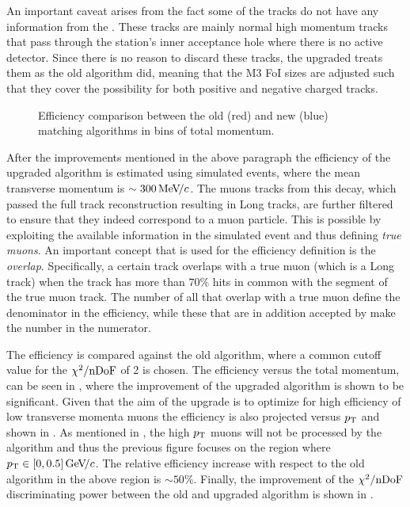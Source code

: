 An important caveat arises from the fact some of the \veloTTracks tracks do not have any information from
the \ttracker. These tracks are mainly normal high momentum tracks that pass through the \ttracker station's inner
acceptance hole where there is no active detector. Since there is no reason to discard these tracks, the upgraded
\mvTTm treats them as the old \mvm algorithm did, meaning that the M3 FoI sizes are adjusted such that they cover
the possibility for both positive and negative charged tracks.

\begin{figure}[t]
  \centering
    \scalebox{.6}{}
  \caption{Efficiency comparison between the old (red) and new (blue) matching algorithms in bins of total momentum.}
 \label{mvm_eff_p_comp}
\end{figure}

After the improvements mentioned in the above paragraph the efficiency of the upgraded \mvTTm algorithm
is estimated using simulated \Sigmapmumu events, where the mean transverse momentum is $\sim 300{\mathrm{\,Me\kern -0.1em V\!/}c}$.
The muons tracks from this decay, which passed the full track reconstruction resulting in Long tracks,
are further filtered to ensure that they indeed correspond to a muon particle. This is possible by
exploiting the available information in the simulated event and thus defining {\it true muons}.
An important concept that is used for the \mvTTm efficiency definition is the {\it overlap}.
Specifically, a certain \velo track overlaps with a true muon (which is a Long track)
when the \velo track has more than $70\%$ \velo hits in common with the \velo segment
of the true muon track. The number of all \veloTTracks that overlap with a true muon define the
denominator in the \mvTTm efficiency, while these \veloTTracks that are in addition accepted by
\mvTTm make the number in the numerator.

The efficiency is compared against the old
\mvm algorithm, where a common cutoff value for the $\chi^2/\rm nDoF$ of 2 is chosen. The efficiency
versus the total momentum, can be seen in , where the improvement of the
upgraded \mvTTm algorithm is shown to be significant.  Given that the aim of the \mvTTm upgrade
is to optimize for high efficiency of low transverse momenta muons the efficiency is also projected
versus $\mbox{$p_{\rm T}$}$ and shown in . As mentioned in , the
high $\mbox{$p_{\rm T}$}$ muons will not be processed by the \mvTTm algorithm and thus the previous figure focuses on
the region where $\mbox{$p_{\rm T}$}\in[0,0.5]{\mathrm{\,Ge\kern -0.1em V\!/}c}$. The relative efficiency increase with respect to the old
\mvm algorithm in the above region is $\sim 50\%$. Finally, the improvement of the $\chi^2/\rm nDoF$
discriminating power between the old and upgraded algorithm is shown in .


